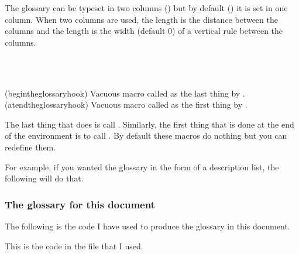 The glossary can be typeset in two columns (\cmd{\twocolglossary})
but by default (\cmd{\onecolglossary}) it is set in one column.
When two columns are used, the length \lnc{\glossarycolsep} is the
distance between the columns and the length \lnc{\glossaryrule} is
the width (default 0) of a vertical rule between the columns.

\begin{syntax}
\cmd{\begintheglossaryhook} \\
\cmd{\atendtheglossaryhook} \\
\end{syntax}
\glossary(begintheglossaryhook)%
  {}%
  {Vacuous macro called as the last thing by .}
\glossary(atendtheglossaryhook)%
  {}%
  {Vacuous macro called as the first thing by .}

The last thing that  does is call 
\cmd{\begintheglossaryhook}. Similarly, the first thing that is done at
the end of the environment is to call \cmd{\atendtheglossaryhook}.
By default these macros do nothing but you can redefine them.

    For example, if you wanted the glossary in the form of a description
list, the following will do that.
\begin{lcode}
\renewcommand*{\begintheglossaryhook}{\begin{description}}
\renewcommand*{\atendtheglossaryhook}{\end{description}}
\renewcommand{\glossitem}[4]{\item[#1:] #2 #3 #4}
\end{lcode}

\subsubsection{The glossary for this document}

    The following is the code I have used to produce the glossary
in this document.

This is the code in the  file that I used.
\begin{lcode}
\makeglossary
{}
\changeglossnum{\thepage}
\renewcommand*{\glossaryname}{Command summary}
\renewcommand*{\glossarymark}{\markboth{\glossaryname}{\glossaryname}}
\renewcommand{\glossitem}[4]{%
  \sbox\@tempboxa{#1 \space #2 #3 \makebox[2em]{#4}}%
  \par\hangindent 2em
  \ifdim\wd\@tempboxa<0.8\linewidth
    #1 \space #2 #3 \dotfill \makebox[2em][r]{#4}\relax
  \else
    #1 \dotfill \makebox[2em][r]{#4}\\
    #2 #3
  \fi}
\end{lcode}

